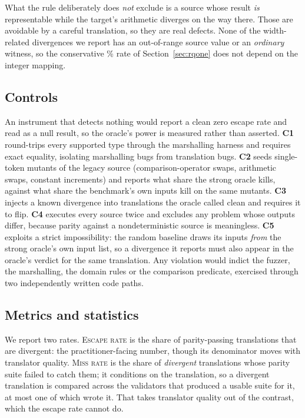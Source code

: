 \documentclass[sigconf]{acmart}
\begin{document}
What the rule deliberately does \emph{not} exclude is a source whose result \emph{is}
representable while the target's arithmetic diverges on the way there. Those are avoidable by a
careful translation, so they are real defects. None of the width-related divergences we report
has an out-of-range source value or an \emph{ordinary} witness, so the conservative
\EscapeOrdinary\% rate of Section~\ref{sec:rqone} does not depend on the integer mapping.

\subsection{Controls}

An instrument that detects nothing would report a clean zero escape rate and read as a null
result, so the oracle's power is measured rather than asserted.
\textbf{C1} round-trips every supported type through the marshalling harness and requires exact
equality, isolating marshalling bugs from translation bugs.
\textbf{C2} seeds single-token mutants of the legacy source (comparison-operator swaps,
arithmetic swaps, constant increments) and reports what share the strong oracle kills, against
what share the benchmark's own inputs kill on the same mutants.
\textbf{C3} injects a known divergence into translations the oracle called clean and requires
it to flip.
\textbf{C4} executes every source twice and excludes any problem whose outputs differ, because
parity against a nondeterministic source is meaningless.
\textbf{C5} exploits a strict impossibility: the random baseline draws its inputs \emph{from} the
strong oracle's own input list, so a divergence it reports must also appear in the oracle's
verdict for the same translation. Any violation would indict the fuzzer, the marshalling, the
domain rules or the comparison predicate, exercised through two independently written code paths.

\subsection{Metrics and statistics}
\label{sec:metrics}

We report two rates. \textsc{Escape rate} is the share of parity-passing translations that are
divergent: the practitioner-facing number, though its denominator moves with translator quality.
\textsc{Miss rate} is the share of \emph{divergent} translations whose parity suite failed to
catch them; it conditions on the translation, so a divergent translation is compared across the
validators that produced a usable suite for it, at most one of which wrote it. That takes
translator quality out of the contrast, which the escape rate cannot do.
\end{document}
